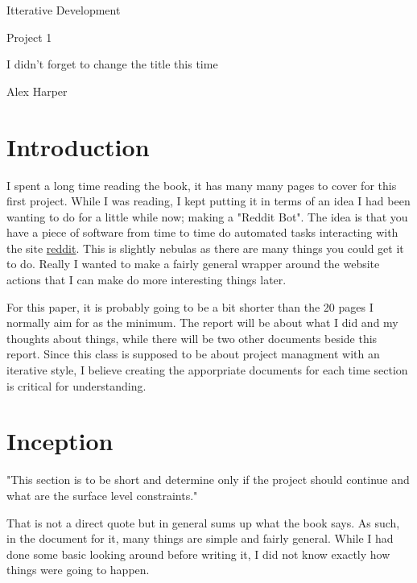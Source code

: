 \documentclass[12pt]{article}
\begin{document}
\begin{titlepage}
	\centering
	{\Huge Itterative Development\par}
	\vspace{0.25in}
	{\Large Project 1\par}
	{\scriptsize I didn't forget to change the title this time\par}
	\vspace{2in}
	{Alex Harper\par}
	\newpage
\end{titlepage}
\tableofcontents
\newpage

\section{Introduction}

I spent a long time reading the book, it has many many pages to cover for this first project.
While I was reading, I kept putting it in terms of an idea I had been wanting to do for a little while now; making a "Reddit Bot".
The idea is that you have a piece of software from time to time do automated tasks interacting with the site \href{http://reddit.com}{reddit}.
This is slightly nebulas as there are many things you could get it to do.
Really I wanted to make a fairly general wrapper around the website actions that I can make do more interesting things later.

For this paper, it is probably going to be a bit shorter than the 20 pages I normally aim for as the minimum.
The report will be about what I did and my thoughts about things, while there will be two other documents beside this report.
Since this class is supposed to be about project managment with an iterative style, I believe creating the apporpriate documents for each time section is critical for understanding.

\section{Inception}

"This section is to be short and determine only if the project should continue and what are the surface level constraints."

That is not a direct quote but in general sums up what the book says.
As such, in the document for it, many things are simple and fairly general.
While I had done some basic looking around before writing it, I did not know exactly how things were going to happen.
\end{document}

